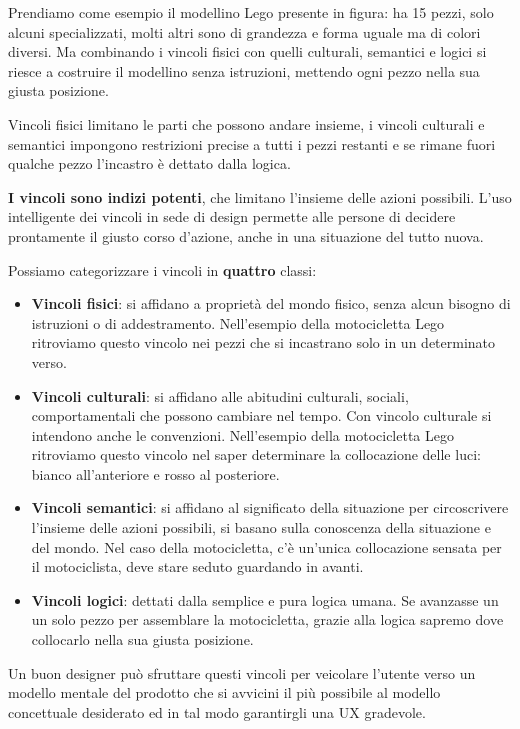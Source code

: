 \documentclass[a4paper,11pt,oneside]{book}
\begin{document}
Prendiamo come esempio il modellino Lego presente in figura: ha 15 pezzi, solo alcuni specializzati, molti altri sono di grandezza e forma uguale ma di colori diversi. Ma combinando i vincoli fisici con quelli culturali, semantici e logici si riesce a costruire il modellino senza istruzioni, mettendo ogni pezzo nella sua giusta posizione.

Vincoli fisici limitano le parti che possono andare insieme, i vincoli culturali e semantici impongono restrizioni precise a tutti i pezzi restanti e se rimane fuori qualche pezzo l'incastro è dettato dalla logica.

\textbf{I vincoli sono indizi potenti}, che limitano l'insieme delle azioni possibili. L'uso intelligente dei vincoli in sede di design permette alle persone di decidere prontamente il giusto corso d'azione, anche in una situazione del tutto nuova.

\pagebreak

Possiamo categorizzare i vincoli in \textbf{quattro} classi:
\begin{itemize}
	\item \textbf{Vincoli fisici}: si affidano a proprietà del mondo fisico, senza alcun bisogno di istruzioni o di addestramento. Nell'esempio della motocicletta Lego ritroviamo questo vincolo nei pezzi che si incastrano solo in un determinato verso.
	\item \textbf{Vincoli culturali}: si affidano alle abitudini culturali, sociali, comportamentali che possono cambiare nel tempo. Con vincolo culturale si intendono anche le convenzioni. Nell'esempio della motocicletta Lego ritroviamo questo vincolo nel saper determinare la collocazione delle luci: bianco all'anteriore e rosso al posteriore.
	\item \textbf{Vincoli semantici}: si affidano al significato della situazione per circoscrivere l'insieme delle azioni possibili, si basano sulla conoscenza della situazione e del mondo. Nel caso della motocicletta, c'è un'unica collocazione sensata per il motociclista, deve stare seduto guardando in avanti.
	\item \textbf{Vincoli logici}: dettati dalla semplice e pura logica umana. Se avanzasse un un solo pezzo per assemblare la motocicletta, grazie alla logica sapremo dove collocarlo nella sua giusta posizione.
\end{itemize}

Un buon designer può sfruttare questi vincoli per veicolare l'utente verso un modello mentale del prodotto che si avvicini il più possibile al modello concettuale desiderato ed in tal modo garantirgli una UX gradevole.
\end{document}
